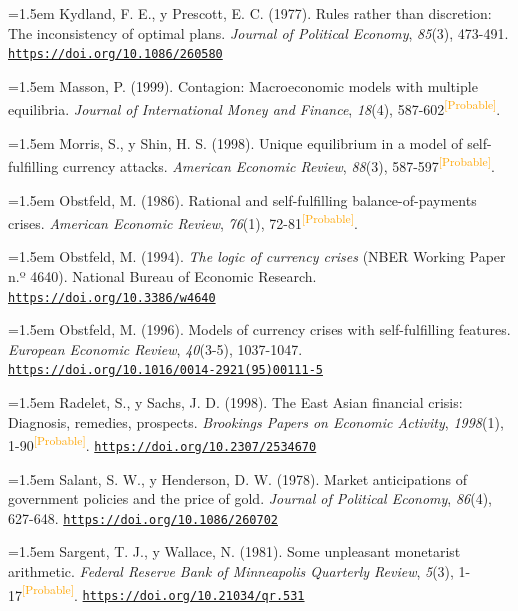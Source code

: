\documentclass[10pt,a4paper]{article}
\begin{document}
\noindent\hangindent=1.5em Kydland, F. E., y Prescott, E. C. (1977). Rules rather than discretion: The inconsistency of optimal plans. \textit{Journal of Political Economy}, \textit{85}(3), 473-491. \href{https://doi.org/10.1086/260580}{\nolinkurl{https://doi.org/10.1086/260580}}

\noindent\hangindent=1.5em Masson, P. (1999). Contagion: Macroeconomic models with multiple equilibria. \textit{Journal of International Money and Finance}, \textit{18}(4), 587-602\textcolor{orange}{\textsuperscript{[Probable]}}.

\noindent\hangindent=1.5em Morris, S., y Shin, H. S. (1998). Unique equilibrium in a model of self-fulfilling currency attacks. \textit{American Economic Review}, \textit{88}(3), 587-597\textcolor{orange}{\textsuperscript{[Probable]}}.

\noindent\hangindent=1.5em Obstfeld, M. (1986). Rational and self-fulfilling balance-of-payments crises. \textit{American Economic Review}, \textit{76}(1), 72-81\textcolor{orange}{\textsuperscript{[Probable]}}.

\noindent\hangindent=1.5em Obstfeld, M. (1994). \textit{The logic of currency crises} (NBER Working Paper n.º 4640). National Bureau of Economic Research. \href{https://doi.org/10.3386/w4640}{\nolinkurl{https://doi.org/10.3386/w4640}}

\noindent\hangindent=1.5em Obstfeld, M. (1996). Models of currency crises with self-fulfilling features. \textit{European Economic Review}, \textit{40}(3-5), 1037-1047. \href{https://doi.org/10.1016/0014-2921(95)00111-5}{\nolinkurl{https://doi.org/10.1016/0014-2921(95)00111-5}}

\noindent\hangindent=1.5em Radelet, S., y Sachs, J. D. (1998). The East Asian financial crisis: Diagnosis, remedies, prospects. \textit{Brookings Papers on Economic Activity}, \textit{1998}(1), 1-90\textcolor{orange}{\textsuperscript{[Probable]}}. \href{https://doi.org/10.2307/2534670}{\nolinkurl{https://doi.org/10.2307/2534670}}

\noindent\hangindent=1.5em Salant, S. W., y Henderson, D. W. (1978). Market anticipations of government policies and the price of gold. \textit{Journal of Political Economy}, \textit{86}(4), 627-648. \href{https://doi.org/10.1086/260702}{\nolinkurl{https://doi.org/10.1086/260702}}

\noindent\hangindent=1.5em Sargent, T. J., y Wallace, N. (1981). Some unpleasant monetarist arithmetic. \textit{Federal Reserve Bank of Minneapolis Quarterly Review}, \textit{5}(3), 1-17\textcolor{orange}{\textsuperscript{[Probable]}}. \href{https://doi.org/10.21034/qr.531}{\nolinkurl{https://doi.org/10.21034/qr.531}}
\end{document}
